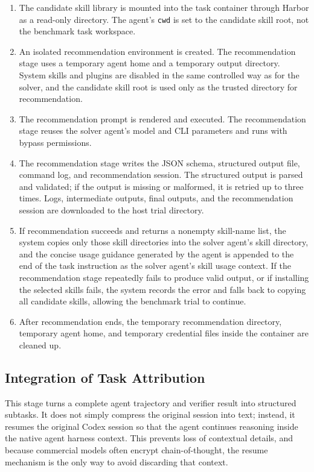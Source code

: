 \begin{enumerate}
    \item The candidate skill library is mounted into the task container through Harbor as a read-only directory. The agent's \texttt{cwd} is set to the candidate skill root, not the benchmark task workspace.
    \item An isolated recommendation environment is created. The recommendation stage uses a temporary agent home and a temporary output directory. System skills and plugins are disabled in the same controlled way as for the solver, and the candidate skill root is used only as the trusted directory for recommendation.
    \item The recommendation prompt is rendered and executed. The recommendation stage reuses the solver agent's model and CLI parameters and runs with bypass permissions.
    \item The recommendation stage writes the JSON schema, structured output file, command log, and recommendation session. The structured output is parsed and validated; if the output is missing or malformed, it is retried up to three times. Logs, intermediate outputs, final outputs, and the recommendation session are downloaded to the host trial directory.
    \item If recommendation succeeds and returns a nonempty skill-name list, the system copies only those skill directories into the solver agent's skill directory, and the concise usage guidance generated by the agent is appended to the end of the task instruction as the solver agent's skill usage context. If the recommendation stage repeatedly fails to produce valid output, or if installing the selected skills fails, the system records the error and falls back to copying all candidate skills, allowing the benchmark trial to continue.
    \item After recommendation ends, the temporary recommendation directory, temporary agent home, and temporary credential files inside the container are cleaned up.
\end{enumerate}

\subsection{Integration of Task Attribution}
This stage turns a complete agent trajectory and verifier result into structured subtasks. It does not simply compress the original session into text; instead, it resumes the original Codex session so that the agent continues reasoning inside the native agent harness context. This prevents loss of contextual details, and because commercial models often encrypt chain-of-thought, the resume mechanism is the only way to avoid discarding that context.

